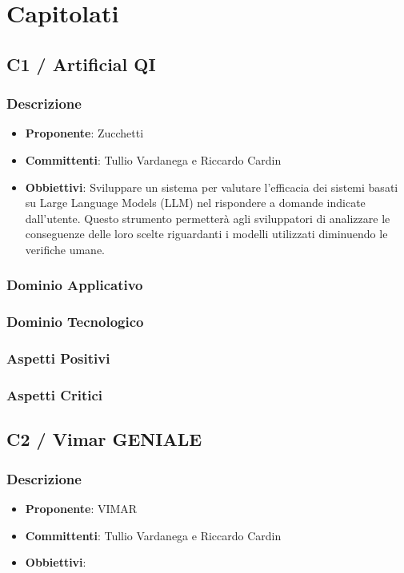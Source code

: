 \documentclass[a4paper, 12pt]{article}
\begin{document}
\section{Capitolati}
\subsection{C1 / Artificial QI}
\subsubsection{Descrizione}
\begin{itemize}
    \item \textbf{Proponente}: Zucchetti
    \item \textbf{Committenti}: Tullio Vardanega e Riccardo Cardin
    \item \textbf{Obbiettivi}: Sviluppare un sistema per valutare l'efficacia dei sistemi basati su Large Language Models (LLM) nel rispondere a domande indicate dall’utente. 
    Questo strumento permetterà agli sviluppatori di analizzare le conseguenze delle loro scelte riguardanti i modelli utilizzati diminuendo le verifiche umane.    
\end{itemize}
\subsubsection{Dominio Applicativo}
\subsubsection{Dominio Tecnologico}
\subsubsection{Aspetti Positivi}
\subsubsection{Aspetti Critici}
\subsection{C2 / Vimar GENIALE}
\subsubsection{Descrizione}
\begin{itemize}
    \item \textbf{Proponente}: VIMAR
    \item \textbf{Committenti}: Tullio Vardanega e Riccardo Cardin
    \item \textbf{Obbiettivi}: 
\end{itemize}
\end{document}
